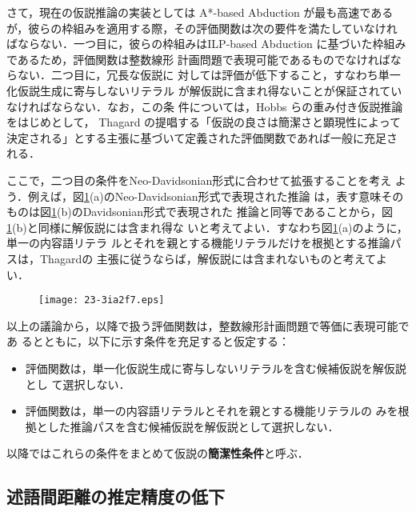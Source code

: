 \documentclass[japanese]{jnlp_1.4}
\begin{document}
さて，現在の仮説推論の実装としては A*-based Abduction が最も高速である
が，彼らの枠組みを適用する際，その評価関数は次の要件を満たしていなけれ
ばならない．一つ目に，彼らの枠組みはILP-based Abduction
\cite{Inoue11,Inoue12b}に基づいた枠組みであるため，評価関数は整数線形
計画問題で表現可能であるものでなければならない．二つ目に，冗長な仮説に
対しては評価が低下すること，すなわち単一化仮説生成に寄与しないリテラル
が解仮説に含まれ得ないことが保証されていなければならない．なお，この条
件については，Hobbs らの重み付き仮説推論をはじめとして，
Thagard \cite{Thagard78}の提唱する「仮説の良さは簡潔さと顕現性によって
決定される」とする主張に基づいて定義された評価関数であれば一般に充足さ
れる．

ここで，二つ目の条件をNeo-Davidsonian形式に合わせて拡張することを考え
よう．例えば，図\ref{fig:phi}(a)のNeo-Davidsonian形式で表現された推論
は，表す意味そのものは図\ref{fig:phi}(b)のDavidsonian形式で表現された
推論と同等であることから，図\ref{fig:phi}(b)と同様に解仮説には含まれ得な
いと考えてよい．すなわち図\ref{fig:phi}(a)のように，単一の内容語リテラ
ルとそれを親とする機能リテラルだけを根拠とする推論パスは，Thagardの
主張に従うならば，解仮説には含まれないものと考えてよい．

\begin{figure}[t]
\begin{center}
\texttt{[image: 23-3ia2f7.eps]}
\end{center}
\label{fig:phi}
\end{figure}

以上の議論から，以降で扱う評価関数は，整数線形計画問題で等価に表現可能であ
るとともに，以下に示す条件を充足すると仮定する：
\begin{itemize}
\item 評価関数は，単一化仮説生成に寄与しないリテラルを含む候補仮説を解仮説とし
	 て選択しない．
\item 評価関数は，単一の内容語リテラルとそれを親とする機能リテラルの
	 みを根拠とした推論パスを含む候補仮説を解仮説として選択しない．
\end{itemize}
以降ではこれらの条件をまとめて仮説の{\bf 簡潔性条件}と呼ぶ．



\subsection{述語間距離の推定精度の低下}
\label{sec:sw-prob}
\end{document}
